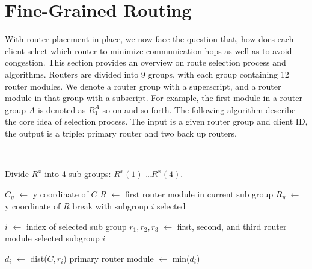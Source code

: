 \section{Fine-Grained Routing}

With router placement in place, we now face the question that, how does each
client select which router to minimize communication hops as well as to avoid
congestion. This section provides an overview on route selection process and
algorithms. Routers are divided into 9 groups, with each group containing 12
router modules. We denote a router group with a superscript, and a router
module in that group with a subscript. For example, the first module in a
router group $A$ is denoted as $R^A_1$ so on and so forth. The following
algorithm describe the core idea of selection process. The input is a given
router group and client ID, the output is a triple: primary router and two back
up routers.

\begin{algorithmic}[1]
 \\ \hrulefill

\State Divide $R^x$ into 4 sub-groups: $R^x(1)$ \ldots $R^x(4)$.

    \State $C_y$ $\leftarrow$ y coordinate of $C$
    \State $R$ $\leftarrow$ first router module in current sub group
    \State $R_y$ $\leftarrow$ y coordinate of $R$
    \State break with subgroup $i$ selected
    \EndIf
\EndFor

\State $i$ $\leftarrow$ index of selected sub group
\State $r_1, r_2, r_3$ $\leftarrow$ first, second, and third router module 
\State \hspace{\algorithmicindent} selected subgroup $i$

    \State $d_i$ $\leftarrow$ dist($C, r_i$) 
    \State primary router module $\leftarrow$ min($d_i$)
\EndFor

\EndProcedure
\\\hrulefill
\end{algorithmic}





